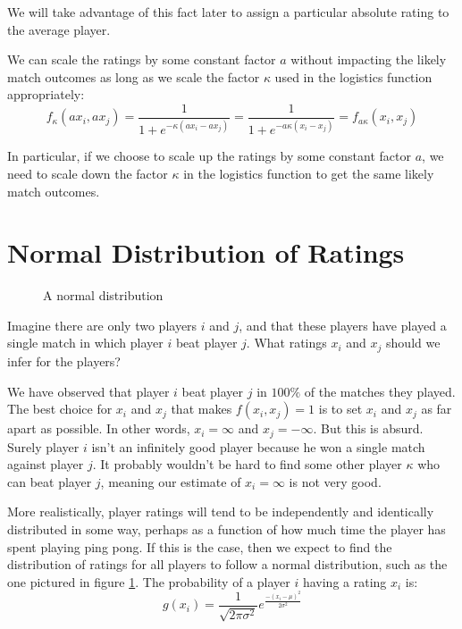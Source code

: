 \documentclass{article}
\begin{document}
We will take advantage of this fact later to assign a particular absolute
rating to the average player.

We can scale the ratings by some constant factor $a$ without impacting the
likely match outcomes as long as we scale the factor $\kappa$ used in the
logistics function appropriately:
\begin{equation*}
  f_\kappa(a x_i, a x_j) =
  \frac{1}{1 + e^{-\kappa(a x_i - a x_j)}} =
  \frac{1}{1 + e^{-a \kappa(x_i - x_j)}} = f_{a \kappa}(x_i, x_j)
\end{equation*}

In particular, if we choose to scale up the ratings by some constant factor
$a$, we need to scale down the factor $\kappa$ in the logistics function to get the
same likely match outcomes.

\section{Normal Distribution of Ratings}
\begin{figure}
  \caption{A normal distribution}
  \label{fig:normal}
 \end{figure}
Imagine there are only two players $i$ and $j$, and that these players have
played a single match in which player $i$ beat player $j$. What ratings $x_i$
and $x_j$ should we infer for the players?

We have observed that player $i$ beat player $j$ in $100\%$ of the matches
they played. The best choice for $x_i$ and $x_j$ that makes $f(x_i, x_j) = 1$
is to set $x_i$ and $x_j$ as far apart as possible. In other words,
$x_i = \infty$ and $x_j = -\infty$. But this is absurd. Surely player $i$
isn't an infinitely good player because he won a single match against player
$j$. It probably wouldn't be hard to find some other player $\kappa$ who can beat
player $j$, meaning our estimate of $x_i = \infty$ is not very good.

More realistically, player ratings will tend to be independently and
identically distributed in some way, perhaps as a function of how much time
the player has spent playing ping pong. If this is the case, then we expect to
find the distribution of ratings for all players to follow a normal
distribution, such as the one pictured in figure \ref{fig:normal}. The
probability of a player $i$ having a rating $x_i$ is:
\begin{equation}
  g(x_i) = \frac{1}{\sqrt{2\pi\sigma^2}} e^{\frac{-(x_i - \mu)^2}{2 \sigma^2}}
\end{equation}
\end{document}
